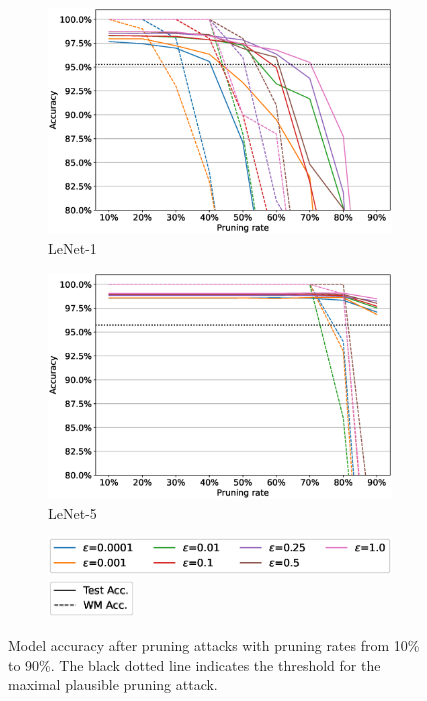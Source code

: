 \begin{figure}
    \centering
    \begin{subfigure}[b]{0.49\linewidth}
    \includegraphics[width = \linewidth]{images/frontier/frontier_influence_epsilon_pruning_lenet1.eps}
    \caption{LeNet-1}
    \label{fig:frontier_influence_epsilon_pruning-a}
    \end{subfigure}
    \begin{subfigure}[b]{0.49\linewidth}
    \includegraphics[width = \linewidth]{images/frontier/frontier_influence_epsilon_pruning_lenet5.eps}
    \caption{LeNet-5}
    \label{fig:frontier_influence_epsilon_pruning-b}
    \end{subfigure}
    \begin{subfigure}[b]{\linewidth}
    \centering
    \includegraphics[height=1cm]{images/frontier/legend_frontier_pruning_perarch_colors.eps}
    \quad
    \includegraphics[height=1cm]{images/frontier/legend_frontier_pruning_perarch_linetypes.eps}
    \end{subfigure}
    
    \caption{Model accuracy after pruning attacks with pruning rates from 10\% to 90\%. The black dotted line indicates the threshold for the maximal plausible pruning attack.}
    \label{fig:frontier_influence_epsilon_pruning}
\end{figure}